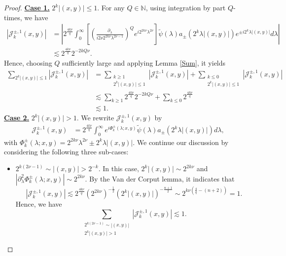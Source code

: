 \documentclass[a4paper,11pt, reqno]{amsart}
\numberwithin{equation}{section}
\theoremstyle{plain}
\theoremstyle{definition}
\theoremstyle{remark}
\begin{document}
\begin{proof}
\textbf{\underline{Case 1.}} $2^k|(x,y)|\leq 1$. For any $Q\in\mathbb{N}$, using integration by part $Q$-times, we have
\begin{align*}
|\mathcal{J}_k^{\pm,1}(x,y)|&=\left|2^\frac{4k\nu}{q}\int_0^\infty  \left[\left(\frac{\partial_\lambda}{i2\nu 2^{2k\nu}\lambda^{2\nu-1}}\right)^Q e^{i2^{2k\nu}\lambda^{2\nu}}\right] \widetilde{\psi}(\lambda)a_{\pm}(2^k\lambda|(x,y)|)e^{\pm i2^k\lambda|(x,y)|}d\lambda\right|\\
&\lesssim 2^\frac{4k\nu}{q}2^{-2kQ\nu}.
\end{align*}
Hence, choosing $Q$ sufficiently large and applying Lemma \ref{Sum}, it yields
\begin{equation}\label{Case 1}
\begin{aligned}
\sum_{2^k|(x,y)|\leq 1}|\mathcal{J}_k^{\pm,1}(x,y)|&=\sum_{\substack{k\geq 1\\ 2^k|(x,y)|\leq 1}}|\mathcal{J}_k^{\pm,1}(x,y)|+\sum_{\substack{k\leq 0\\ 2^k|(x,y)|\leq 1}}|\mathcal{J}_k^{\pm,1}(x,y)|\\
&\lesssim \sum_{k\geq1}2^\frac{4k\nu}{q}2^{-2kQ\nu}+\sum_{k\leq 0}2^\frac{4k\nu}{q}\\
&\lesssim 1.
\end{aligned}
\end{equation}
\textbf{\underline{Case 2.}} $2^k|(x,y)|>1$. We rewrite $\mathcal{J}_k^{\pm,1}(x,y)$ by
\begin{align*}
\mathcal{J}_k^{\pm,1}(x,y)
&=2^\frac{4k\nu}{q}\int_0^\infty  e^{i\Phi^\pm_k(\lambda;x,y)}\widetilde{\psi}(\lambda)a_{\pm}(2^k\lambda|(x,y)|)d\lambda,
\end{align*} 
with $\Phi^\pm_k(\lambda;x,y)=2^{2k\nu}\lambda^{2\nu} \pm 2^k\lambda|(x,y)|$. We continue our discussion by considering the following three sub-cases:
\begin{itemize}
\item $2^{k(2\nu-1)}\sim |(x,y)|>2^{-k}$. In this case, $2^k|(x,y)|\sim 2^{2k\nu}$ and $|\partial_\lambda^2\Phi^\pm_k(\lambda;x,y)|\sim 2^{2k\nu}$. By the Van der Corput lemma, it indicates that
\begin{equation}
|\mathcal{J}_k^{\pm,1}(x,y)|\lesssim 2^\frac{4k\nu}{q} \left(2^{2k\nu}\right)^{-\frac{1}{2}}\left(2^k|(x,y)|\right)^{-\frac{n+1}{2}}\sim 2^{k\nu(\frac{4}{q}-(n+2))}=1.
\end{equation}
Hence, we have
\begin{equation}\label{Subcase 1}
\sum_{\substack{2^{k(2\nu-1)}\sim |(x,y)|\\ 2^k|(x,y)|>1}}|\mathcal{J}_k^{\pm,1}(x,y)|\lesssim 1.

\end{equation}
\end{itemize}
\end{proof}
\end{document}
